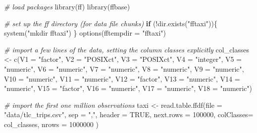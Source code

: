 \documentclass[
  12pt,
]{style/krantz}
\newenvironment{Shaded}{\begin{snugshade}}{\end{snugshade}}
\newcommand{\AttributeTok}[1]{\textcolor[rgb]{0.77,0.63,0.00}{#1}}
\newcommand{\CommentTok}[1]{\textcolor[rgb]{0.56,0.35,0.01}{\textit{#1}}}
\newcommand{\ConstantTok}[1]{\textcolor[rgb]{0.00,0.00,0.00}{#1}}
\newcommand{\ControlFlowTok}[1]{\textcolor[rgb]{0.13,0.29,0.53}{\textbf{#1}}}
\newcommand{\DecValTok}[1]{\textcolor[rgb]{0.00,0.00,0.81}{#1}}
\newcommand{\FunctionTok}[1]{\textcolor[rgb]{0.00,0.00,0.00}{#1}}
\newcommand{\NormalTok}[1]{#1}
\newcommand{\OtherTok}[1]{\textcolor[rgb]{0.56,0.35,0.01}{#1}}
\newcommand{\SpecialCharTok}[1]{\textcolor[rgb]{0.00,0.00,0.00}{#1}}
\newcommand{\StringTok}[1]{\textcolor[rgb]{0.31,0.60,0.02}{#1}}
\begin{document}
\begin{Shaded}
\begin{Highlighting}[]
\CommentTok{\# load packages}
\FunctionTok{library}\NormalTok{(ff)}
\FunctionTok{library}\NormalTok{(ffbase)}

\CommentTok{\# set up the ff directory (for data file chunks)}
\ControlFlowTok{if}\NormalTok{ (}\SpecialCharTok{!}\FunctionTok{dir.exists}\NormalTok{(}\StringTok{"fftaxi"}\NormalTok{))\{}
     \FunctionTok{system}\NormalTok{(}\StringTok{"mkdir fftaxi"}\NormalTok{)}
\NormalTok{\}}
\FunctionTok{options}\NormalTok{(}\AttributeTok{fftempdir =} \StringTok{"fftaxi"}\NormalTok{)}

\CommentTok{\# import a few lines of the data, setting the column classes explicitly}
\NormalTok{col\_classes }\OtherTok{\textless{}{-}} \FunctionTok{c}\NormalTok{(}\AttributeTok{V1 =} \StringTok{"factor"}\NormalTok{,}
                 \AttributeTok{V2 =} \StringTok{"POSIXct"}\NormalTok{,}
                 \AttributeTok{V3 =} \StringTok{"POSIXct"}\NormalTok{,}
                 \AttributeTok{V4 =} \StringTok{"integer"}\NormalTok{,}
                 \AttributeTok{V5 =} \StringTok{"numeric"}\NormalTok{,}
                 \AttributeTok{V6 =} \StringTok{"numeric"}\NormalTok{,}
                 \AttributeTok{V7 =} \StringTok{"numeric"}\NormalTok{,}
                 \AttributeTok{V8 =} \StringTok{"numeric"}\NormalTok{,}
                 \AttributeTok{V9 =} \StringTok{"numeric"}\NormalTok{,}
                 \AttributeTok{V10 =} \StringTok{"numeric"}\NormalTok{,}
                 \AttributeTok{V11 =} \StringTok{"numeric"}\NormalTok{,}
                 \AttributeTok{V12 =} \StringTok{"factor"}\NormalTok{,}
                 \AttributeTok{V13 =} \StringTok{"numeric"}\NormalTok{,}
                 \AttributeTok{V14 =} \StringTok{"numeric"}\NormalTok{,}
                 \AttributeTok{V15 =} \StringTok{"factor"}\NormalTok{,}
                 \AttributeTok{V16 =} \StringTok{"numeric"}\NormalTok{,}
                 \AttributeTok{V17 =} \StringTok{"numeric"}\NormalTok{,}
                 \AttributeTok{V18 =} \StringTok{"numeric"}\NormalTok{)}

\CommentTok{\# import the first one million observations}
\NormalTok{taxi }\OtherTok{\textless{}{-}} \FunctionTok{read.table.ffdf}\NormalTok{(}\AttributeTok{file =} \StringTok{"data/tlc\_trips.csv"}\NormalTok{,}
                        \AttributeTok{sep =} \StringTok{","}\NormalTok{,}
                        \AttributeTok{header =} \ConstantTok{TRUE}\NormalTok{,}
                        \AttributeTok{next.rows =} \DecValTok{100000}\NormalTok{,}
                        \AttributeTok{colClasses=}\NormalTok{ col\_classes,}
                        \AttributeTok{nrows =} \DecValTok{1000000}
\NormalTok{                        )}
\end{Highlighting}
\end{Shaded}
\end{document}

